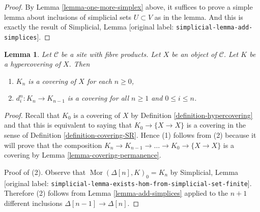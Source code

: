 \documentclass[10pt,a4paper]{article}
\theoremstyle{plain}
\newtheorem{lemma}[subsection]{Lemma}
\theoremstyle{definition}
\theoremstyle{remark}
\numberwithin{equation}{subsection}
\def\Mor{\mathop{\mathrm{Mor}}\nolimits}
\begin{document}
\begin{proof}
By Lemma \ref{lemma-one-more-simplex}
above, it suffices to prove a simple lemma
about inclusions of simplicial sets $U \subset V$ as in the
lemma. And this is exactly the result of
Simplicial, Lemma \textnormal{[original label: \nolinkurl{simplicial-lemma-add-simplices}]}.
\end{proof}

\begin{lemma}
\label{lemma-degeneracy-maps-coverings}
Let $\mathcal{C}$ be a site with fibre products. Let $X$ be an object of
$\mathcal{C}$. Let $K$ be a hypercovering of $X$. Then
\begin{enumerate}
\item $K_n$ is a covering of $X$ for each $n \geq 0$,
\item $d^n_i : K_n \to K_{n - 1}$ is a covering for all $n \geq 1$
and $0 \leq i \leq n$.
\end{enumerate}
\end{lemma}

\begin{proof}
Recall that $K_0$ is a covering of $X$ by
Definition \ref{definition-hypercovering}
and that this is equivalent to saying that
$K_0 \to \{X \to X\}$ is a covering in the sense
of Definition \ref{definition-covering-SR}.
Hence (1) follows from (2) because it will prove that
the composition
$K_n \to K_{n - 1} \to \ldots \to K_0 \to \{X \to X\}$
is a covering by Lemma \ref{lemma-covering-permanence}.

\medskip\noindent
Proof of (2). Observe that
$\Mor(\Delta[n], K)_0 = K_n$ by
Simplicial, Lemma \textnormal{[original label: \nolinkurl{simplicial-lemma-exists-hom-from-simplicial-set-finite}]}.
Therefore (2) follows from Lemma \ref{lemma-add-simplices}
applied to the $n + 1$ different inclusions $\Delta[n - 1] \to \Delta[n]$.
\end{proof}
\end{document}
